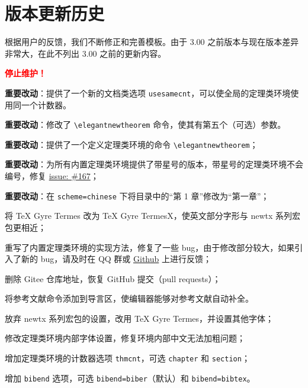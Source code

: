 \documentclass[lang=cn,newtx,10pt,scheme=chinese,pad,twocol]{zznote}
\begin{document}
\chapter{版本更新历史}

根据用户的反馈，我们不断修正和完善模板。由于 3.00 之前版本与现在版本差异非常大，在此不列出 3.00 之前的更新内容。

 \textcolor{red}{\bfseries 停止维护！}

\begin{change}
	\item \textbf{重要改动}：提供了一个新的文档类选项 \lstinline|usesamecnt|，可以使全局的定理类环境使用同一个计数器。
	\item \textbf{重要改动}：修改了 \lstinline|\elegantnewtheorem| 命令，使其有第五个（可选）参数。
\end{change}


\begin{change}
	\item \textbf{重要改动}：提供了一个定义定理类环境的命令 \lstinline|\elegantnewtheorem|；
	\item \textbf{重要改动}：为所有内置定理类环境提供了带星号的版本，带星号的定理类环境不会编号，修复 \href{https://github.com/ElegantLaTeX/ElegantBook/issues/167}{issue: \#167}；
	\item \textbf{重要改动}：在 \lstinline{scheme=chinese} 下将目录中的“第 1 章”修改为“第一章”；
	\item 将 TeX Gyre Termes 改为 TeX Gyre TermesX，使英文部分字形与 newtx 系列宏包更相近；
	\item 重写了内置定理类环境的实现方法，修复了一些 bug，由于修改部分较大，如果引入了新的 bug，请及时在 QQ 群或 \href{https://github.com/ElegantLaTeX}{Github} 上进行反馈；
	\item 删除 Gitee 仓库地址，恢复 GitHub 提交（pull requests）；
	\item 将参考文献命令添加到导言区，使编辑器能够对参考文献自动补全。
\end{change}


\begin{change}
	\item 放弃 newtx 系列宏包的设置，改用 TeX Gyre Termes，并设置其他字体；
	\item 修改定理类环境内部字体设置，修复环境内部中文无法加粗问题；
	\item 增加定理类环境的计数器选项 \lstinline{thmcnt}，可选 \lstinline{chapter} 和 \lstinline{section}；
	\item 增加 \lstinline{bibend} 选项，可选 \lstinline{bibend=biber}（默认）和 \lstinline{bibend=bibtex}。
\end{change}
\end{document}
